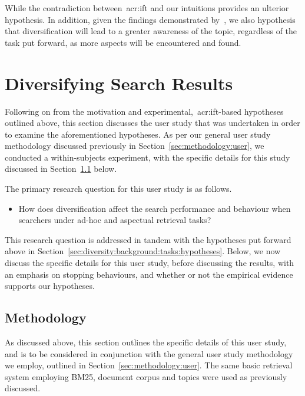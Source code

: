 While the contradiction between~\gls{acr:ift} and our intuitions provides an ulterior hypothesis. In addition, given the findings demonstrated by~\cite{syed2017sal}, we also hypothesis that diversification will lead to a greater awareness of the topic, regardless of the task put forward, as more aspects will be encountered and found.

\section{Diversifying Search Results}\label{sec:diversity:users}
Following on from the motivation and experimental,~\gls{acr:ift}-based hypotheses outlined above, this section discusses the user study that was undertaken in order to examine the aforementioned hypotheses. As per our general user study methodology discussed previously in Section~\ref{sec:methodology:user}, we conducted a within-subjects experiment, with the specific details for this study discussed in Section~\ref{sec:diversity:users:method} below.

The primary research question for this user study is as follows.

\begin{itemize}
    \item{ How does diversification affect the search performance and behaviour when searchers under ad-hoc and aspectual retrieval tasks?}
\end{itemize}

This research question is addressed in tandem with the hypotheses put forward above in Section~\ref{sec:diversity:background:tasks:hypotheses}. Below, we now discuss the specific details for this user study, before discussing the results, with an emphasis on stopping behaviours, and whether or not the empirical evidence supports our hypotheses.

\subsection{Methodology}\label{sec:diversity:users:method}
As discussed above, this section outlines the specific details of this user study, and is to be considered in conjunction with the general user study methodology we employ, outlined in Section~\ref{sec:methodology:user}. The same basic retrieval system employing BM25, document corpus and topics were used as previously discussed.

